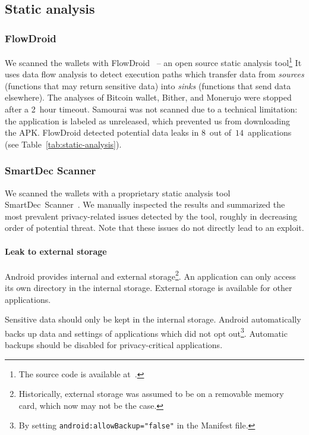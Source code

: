 \subsection{Static analysis}

\subsubsection*{FlowDroid}

We scanned the wallets with FlowDroid~\cite{Arzt2014} -- an open source static analysis tool\footnote{The source code is available at~\cite{FlowDroid}.}
It uses data flow analysis to detect execution paths which transfer data from \textit{sources} (functions that may return sensitive data) into \textit{sinks} (functions that send data elsewhere).
The analyses of Bitcoin wallet, Bither, and Monerujo were stopped after a 2~hour timeout.
Samourai was not scanned due to a technical limitation: the application is labeled as unreleased, which prevented us from downloading the APK\@.
FlowDroid detected potential data leaks in $8$~out of~$14$~applications (see Table~\ref{tab:static-analysis}).

\subsubsection*{SmartDec Scanner}
We scanned the wallets with a proprietary static analysis tool SmartDec~Scanner~\cite{SmartDec2018}.
We manually inspected the results and summarized the most prevalent privacy-related issues detected by the tool, roughly in decreasing order of potential threat.
Note that these issues do not directly lead to an exploit.

\paragraph{Leak to external storage}
Android provides internal and external storage\footnote{Historically, external storage was assumed to be on a removable memory card, which now may not be the case.}.
An application can only access its own directory in the internal storage.
External storage is available for other applications.

Sensitive data should only be kept in the internal storage.
Android automatically backs up data and settings of applications which did not opt out\footnote{By setting \texttt{android:allowBackup="false"} in the Manifest file.}.
Automatic backups should be disabled for privacy-critical applications.

